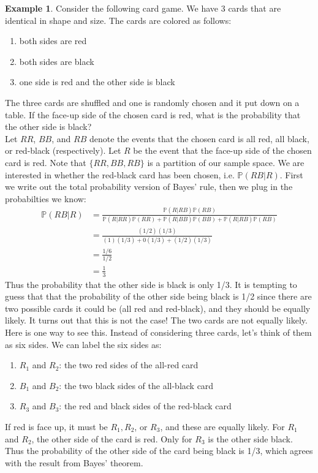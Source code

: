 \documentclass[12pt]{article}
\theoremstyle{definition}
\newtheorem*{example}{Example}
\theoremstyle{remark}
\def\P{{\mathbb P}}
\begin{document}
\begin{example}Consider the following card game. We have 3 cards that are identical in shape and size. The cards are colored as follows:
\begin{enumerate}
\item both sides are red
\item both sides are black
\item one side is red and the other side is black
\end{enumerate}
The three cards are shuffled and one is randomly chosen and it put down on a table. If the face-up side of the chosen card is red, what is the probability that the other side is black?\\

Let $RR$, $BB$, and $RB$ denote the events that the chosen card is all red, all black, or red-black (respectively). Let $R$ be the event that the face-up side of the chosen card is red. Note that $\{RR, BB, RB\}$ is a partition of our sample space. We are interested in whether the red-black card has been chosen, i.e. $\P(RB|R)$. First we write out the total probability version of Bayes' rule, then we plug in the probabilties we know:
\begin{align*}
\P(RB|R) &= \frac{ \P(R|RB) \P(RB) }{ \P(R|RR)\P(RR) + \P(R|BB)\P(BB) + \P(R|RB)\P(RB) } \\
&= \frac{(1/2)(1/3)}{ (1)(1/3) + 0(1/3) + (1/2)(1/3) } \\
&= \frac{1/6}{1/2} \\
&= \frac{1}{3}
\end{align*}
Thus the probability that the other side is black is only 1/3. It is tempting to guess that that the probability of the other side being black is 1/2 since there are two possible cards it could be (all red and red-black), and they should be equally likely. It turns out that this is not the case! The two cards are not equally likely. Here is one way to see this. Instead of considering three cards, let's think of them as six sides. We can label the six sides as:
\begin{enumerate}
\item $R_1$ and $R_2$: the two red sides of the all-red card
\item $B_1$ and $B_2$: the two black sides of the all-black card
\item $R_3$ and $B_3$: the red and black sides of the red-black card
\end{enumerate}
If red is face up, it must be $R_1, R_2$, or $R_3$, and these are equally likely. For $R_1$ and $R_2$, the other side of the card is red. Only for $R_3$ is the other side black. Thus the probability of the other side of the card being black is 1/3, which agrees with the result from Bayes' theorem.
\end{example}
\end{document}
